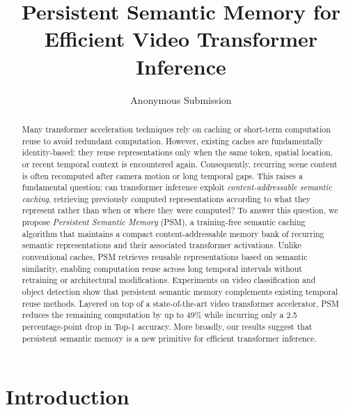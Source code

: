 \documentclass[letterpaper]{article}
\title{Persistent Semantic Memory for Efficient Video Transformer Inference}
\author{Anonymous Submission}
\begin{document}
\maketitle

\begin{abstract}
Many transformer acceleration techniques rely on caching or short-term
computation reuse to avoid redundant computation. However, existing
caches are fundamentally identity-based: they reuse representations only
when the same token, spatial location, or recent temporal context is
encountered again. Consequently, recurring scene content is often
recomputed after camera motion or long temporal gaps. This raises a
fundamental question: can transformer inference exploit
\emph{content-addressable semantic caching}, retrieving previously
computed representations according to what they represent rather than
when or where they were computed?
%
To answer this question, we propose \emph{Persistent Semantic Memory}
(PSM), a training-free semantic caching algorithm that maintains a
compact content-addressable memory bank of recurring semantic
representations and their associated transformer activations. Unlike
conventional caches, PSM retrieves reusable representations based on
semantic similarity, enabling computation reuse across long temporal
intervals without retraining or architectural modifications.
%
Experiments on video classification and object detection show that
persistent semantic memory complements existing temporal reuse methods.
Layered on top of a state-of-the-art video transformer accelerator,
PSM reduces the remaining computation by up to 49\% while incurring
only a 2.5 percentage-point drop in Top-1 accuracy. More broadly, our results suggest
that persistent semantic memory is a new primitive for efficient
transformer inference.
\end{abstract}

\section{Introduction}
 
\end{document}
